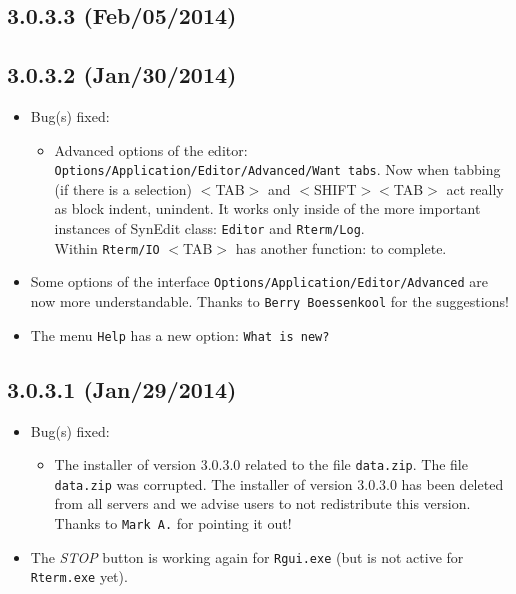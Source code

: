 \subsection*{3.0.3.3 (Feb/05/2014)}


\subsection*{3.0.3.2 (Jan/30/2014)}
\begin{itemize}
  \item Bug(s) fixed:
    \begin{itemize}
      \item Advanced options of the editor: \texttt{Options/Application/Editor/Advanced/Want tabs}.
       Now when tabbing (if there is a selection) $<$TAB$>$ and $<$SHIFT$>$$<$TAB$>$ act really as block indent, unindent.
       It works only inside of the more important instances of SynEdit class: \texttt{Editor} and \texttt{Rterm/Log}. \\
       Within \texttt{Rterm/IO} $<$TAB$>$ has another function: to complete.
    \end{itemize}
  \item Some options of the interface \texttt{Options/Application/Editor/Advanced} are now more understandable.
   Thanks to \texttt{Berry Boessenkool} for the suggestions!
  \item The menu \texttt{Help} has a new option: \texttt{What is new?}
\end{itemize}


\subsection*{3.0.3.1 (Jan/29/2014)}
\begin{itemize}
  \item Bug(s) fixed:
    \begin{itemize}
      \item The installer of version 3.0.3.0 related to the file \texttt{data.zip}.
       The file \texttt{data.zip} was corrupted. The installer of version 3.0.3.0 has been deleted from all servers
       and we advise users to not redistribute this version. Thanks to \texttt{Mark A.} for pointing it out!
    \end{itemize}
  \item The \textit{STOP} button is working again for \texttt{Rgui.exe} (but is not active for \texttt{Rterm.exe} yet).
\end{itemize}



